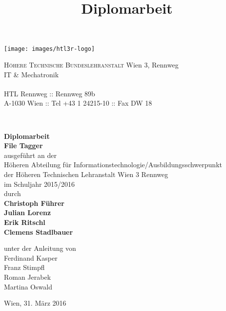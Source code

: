 \documentclass[12pt,a4paper,english,oneside,openright,DIV=12,BCOR=1cm]{scrbook}
\begin{document}
\title{Diplomarbeit}
\begin{titlepage}
\begin{minipage}[b]{1\columnwidth}
\parbox[b]{50mm}{\texttt{[image: images/htl3r-logo]}}
\hfill
\parbox[b]{130mm}{\footnotesize \textsc{Höhere Technische Bundeslehranstalt} Wien 3, Rennweg\\
IT \& Mechatronik\\
\\
HTL Rennweg :: Rennweg 89b\\
A-1030 Wien :: Tel +43 1 24215-10 :: Fax DW 18
}\\
\mbox{}
\end{minipage}

\vspace{1cm}


\begin{center}
\textbf{\LARGE{}Diplomarbeit}{\large{}}\\
{\large{}\vspace{15mm}
 }
\textbf{\large{}File Tagger}\\
 \vspace{15mm}
 ausgeführt an der\\
 Höheren Abteilung für Informationstechnologie/Ausbildungsschwerpunkt\\
 der Höheren Technischen Lehranstalt Wien 3 Rennweg\\
 \vspace{1cm}
 im Schuljahr 2015/2016\\
 \vspace{1cm}
 durch\\
 \vspace{0.5cm}
\textbf{\large{}Christoph Führer}\\
\textbf{\large{}Julian Lorenz}\\
\textbf{\large{}Erik Ritschl}\\
\textbf{\large{}Clemens Stadlbauer}\\

\par\end{center}{\large \par}

\begin{center}
\vspace{20mm}
 \normalsize unter der Anleitung von\\
 \vspace{0.5cm}
 Ferdinand Kasper\\
Franz Stimpfl\\
Roman Jerabek\\
Martina Oswald \\
\par\end{center}

\begin{center}
\vspace{5mm}
Wien, 31. März 2016
\par\end{center}

\end{titlepage}%
\end{document}
